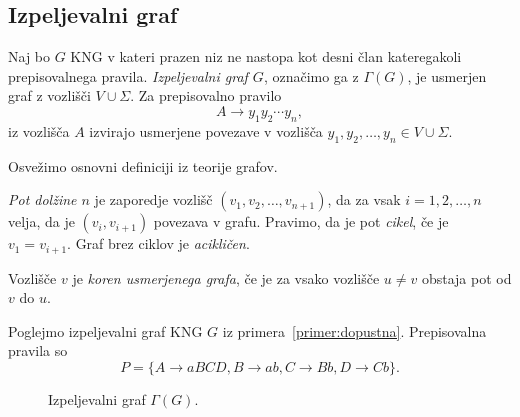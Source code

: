 \documentclass[fin1, tisk]{fmfdelo}
\theoremstyle{definition}
\begin{document}
\subsection{Izpeljevalni graf}

\begin{definicija}
    Naj bo $G$ KNG v kateri prazen niz ne nastopa kot desni član kateregakoli
    prepisovalnega pravila. \emph{Izpeljevalni graf $G$}, označimo ga z $\Gamma(G)$, je 
    usmerjen graf z vozlišči $ V \cup \Sigma $. Za prepisovalno pravilo
    \[    
        A \rightarrow y_1 y_2 \cdots y_n,
    \]
    iz vozlišča $A$ izvirajo usmerjene povezave v vozlišča $y_1, y_2, \ldots, y_n \in V \cup \Sigma$.
\end{definicija}

Osvežimo osnovni definiciji iz teorije grafov.

\begin{definicija}
    \emph{Pot dolžine $n$} je zaporedje vozlišč $(v_1, v_2, \ldots, v_{n+1})$, da za vsak 
    $i = 1, 2, \ldots, n$ velja, da je $(v_i,v_{i+1})$ povezava v grafu. 
    Pravimo, da je pot \emph{cikel}, če je $v_1 = v_{i+1}$. Graf brez ciklov je \emph{acikličen}.
\end{definicija}

\begin{definicija}
    Vozlišče $v$ je \emph{koren usmerjenega grafa}, če je za vsako vozlišče $u \neq v$ obstaja
    pot od $v$ do $u$.
\end{definicija}

\begin{primer}\label{primer:izpeljevalni}
    Poglejmo izpeljevalni graf KNG $G$ iz primera~\ref{primer:dopustna}. Prepisovalna pravila so
    \[
        P = \{ A \rightarrow \mathit{aBCD}, B \rightarrow \mathit{ab}, C \rightarrow 
        \mathit{Bb}, 
        D \rightarrow \mathit{Cb} \}.
    \]
    \begin{figure}[H]
        \centering
    \caption{Izpeljevalni graf $\Gamma(G)$.}
    \end{figure}
\end{primer}
\end{document}

